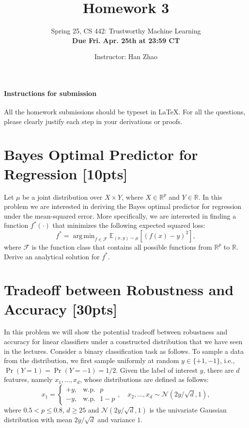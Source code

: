 \documentclass[letterpaper,11pt]{article}
\title{\huge Homework 3} %
\author{\large Spring 25, CS 442: Trustworthy Machine Learning  \\ \textbf{Due Fri. Apr. 25th at 23:59 CT}} %
\date{Instructor: Han Zhao} %
\theoremstyle{definition}
\newcommand{\RR}{\mathbb{R}}
\newcommand{\EE}{\mathbb{E}}
\DeclareMathOperator*{\argmin}{arg\,min}
\begin{document}
\maketitle %
\paragraph{Instructions for submission}
All the homework submissions should be typeset in \LaTeX. For all the questions, please clearly justify each step in your derivations or proofs.

\section{Bayes Optimal Predictor for Regression [10pts]}
Let $\mu$ be a joint distribution over $X\times Y$, where $X\in\RR^p$ and $Y\in \RR$. In this problem we are interested in deriving the Bayes optimal predictor for regression under the mean-squared error. More specifically, we are interested in finding a function $f^*(\cdot)$ that minimizes the following expected squared loss:
\begin{equation*}
    f^* = \argmin_{f\in\mathcal{F}}\EE_{(x, y)\sim \mu}\left[(f(x) - y)^2\right],
\end{equation*}
where $\mathcal{F}$ is the function class that contains all possible functions from $\RR^p$ to $\RR$. Derive an analytical solution for $f^*$.


\section{Tradeoff between Robustness and Accuracy [30pts]}
In this problem we will show the potential tradeoff between robustness and accuracy for linear classifiers under a constructed distribution that we have seen in the lectures. Consider a binary classification task as follows. To sample a data from the distribution, we first sample uniformly at random $y\in\{+1, -1\}$, i.e., $\Pr(Y = 1) = \Pr(Y = -1) = 1/2$. Given the label of interest $y$, there are $d$ features, namely $x_1, \ldots, x_d$, whose distributions are defined as follows:
\begin{equation*}
    x_1 = \begin{cases}
    +y, & \text{w.p.~ $p$} \\
    -y, & \text{w.p.~ $1-p$}
    \end{cases},\quad x_2,\ldots,x_d \sim \mathcal{N}(2y/\sqrt{d}, 1),
\end{equation*}
where $0.5 < p \leq 0.8$, $d \geq 25$ and $\mathcal{N}(2y/\sqrt{d}, 1)$ is the univariate Gaussian distribution with mean $2y/\sqrt{d}$ and variance $1$.
\end{document}
